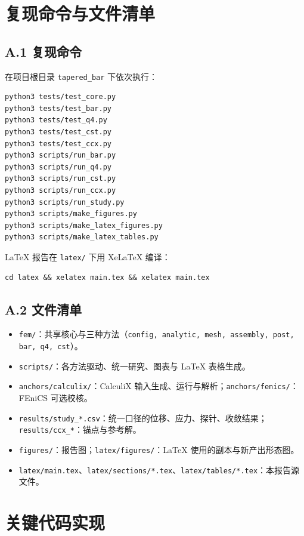 \section{复现命令与文件清单}

\subsection*{A.1 复现命令}

在项目根目录 \texttt{tapered\_bar} 下依次执行：
\begin{verbatim}
python3 tests/test_core.py
python3 tests/test_bar.py
python3 tests/test_q4.py
python3 tests/test_cst.py
python3 tests/test_ccx.py
python3 scripts/run_bar.py
python3 scripts/run_q4.py
python3 scripts/run_cst.py
python3 scripts/run_ccx.py
python3 scripts/run_study.py
python3 scripts/make_figures.py
python3 scripts/make_latex_figures.py
python3 scripts/make_latex_tables.py
\end{verbatim}
LaTeX 报告在 \texttt{latex/} 下用 XeLaTeX 编译：
\begin{verbatim}
cd latex && xelatex main.tex && xelatex main.tex
\end{verbatim}

\subsection*{A.2 文件清单}

\begin{itemize}[leftmargin=1.6em,itemsep=0.15em]
  \item \texttt{fem/}：共享核心与三种方法（\texttt{config, analytic, mesh, assembly, post, bar, q4, cst}）。
  \item \texttt{scripts/}：各方法驱动、统一研究、图表与 LaTeX 表格生成。
  \item \texttt{anchors/calculix/}：CalculiX 输入生成、运行与解析；\texttt{anchors/fenics/}：FEniCS 可选校核。
  \item \texttt{results/study\_*.csv}：统一口径的位移、应力、探针、收敛结果；\texttt{results/ccx\_*}：锚点与参考解。
  \item \texttt{figures/}：报告图；\texttt{latex/figures/}：LaTeX 使用的副本与新产出形态图。
  \item \texttt{latex/main.tex}、\texttt{latex/sections/*.tex}、\texttt{latex/tables/*.tex}：本报告源文件。
\end{itemize}

\section{关键代码实现}

